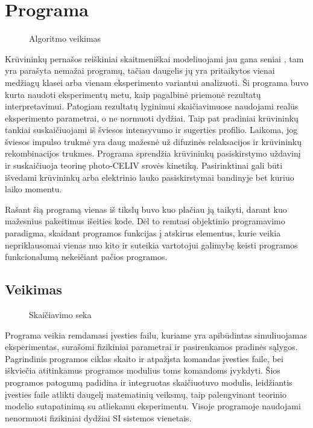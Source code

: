  
\section{Programa}

\begin{figure}
\centering

\caption{Algoritmo veikimas}
  \label{fig:algoritmas}
\end{figure}

Krūvininkų pernašos reiškiniai skaitmeniškai modeliuojami jau gana seniai \cite{juška:4946}, tam yra parašyta nemažai programų, tačiau daugelis jų yra pritaikytos vienai medžiagų klasei arba vienam eksperimento variantui analizuoti. Ši programa buvo kurta naudoti eksperimentų metu, kaip pagalbinė priemonė rezultatų interpretavimui. Patogiam rezultatų lyginimui skaičiavimuose naudojami realūs eksperimento parametrai, o ne normuoti dydžiai. Taip pat pradiniai krūvininkų tankiai suskaičiuojami iš šviesos intensyvumo ir sugerties profilio. Laikoma, jog šviesos impulso trukmė yra daug mažesnė už difuzinės relaksacijos ir krūvininkų rekombinacijos trukmes. Programa sprendžia krūvininkų pasiskirstymo uždavinį ir suskaičiuoja teorinę photo-CELIV srovės kinetiką. Pasirinktinai gali būti išvedami krūvininkų arba elektrinio lauko pasiskirstymai bandinyje bet kuriuo laiko momentu.

Rašant šią programą vienas iš tikslų buvo kuo plačiau ją taikyti, darant kuo mažesnius pakeitimus išeities kode. Dėl to remtasi objektinio programavimo paradigma, skaidant programos funkcijas į atskirus elementus, kurie veikia nepriklausomai vienas nuo kito ir suteikia vartotojui galimybę keisti programos funkcionalumą nekeičiant pačios programos.
\subsection{Veikimas}

\begin{figure}
  \begin{center}
	
  \end{center}
  \caption{Skaičiavimo seka}
  \label{fig:skaičiavimas}
\end{figure}

Programa veikia remdamasi įvesties failu, kuriame yra apibūdintas simuliuojamas eksperimentas, surašomi fizikiniai parametrai ir pasirenkamos pradinės sąlygos. Pagrindinis programos ciklas skaito ir atpažįsta komandas įvesties faile, bei iškviečia atitinkamus programos modulius toms komandoms įvykdyti. Šios programos patogumą padidina ir integruotas skaičiuotuvo modulis, leidžiantis įvesties faile atlikti daugelį matematinių veiksmų, taip palengvinant teorinio modelio sutapatinimą su atliekamu eksperimentu.
Visoje programoje naudojami nenormuoti fizikiniai dydžiai SI sistemos vienetais.
